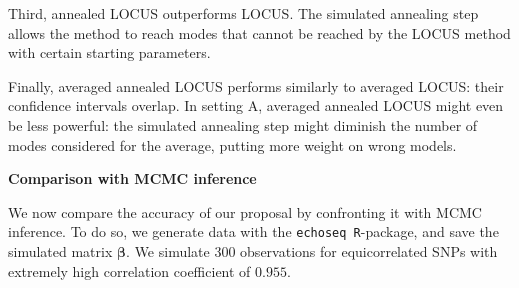 \documentclass[final]{beamer}
\begin{document}
\begin{multicols*}{3}
Third, annealed LOCUS outperforms LOCUS. The simulated annealing step allows the method to reach modes that cannot be reached by the LOCUS method with certain starting parameters. 

Finally, averaged annealed LOCUS performs similarly to averaged LOCUS: their confidence intervals overlap. In setting A, averaged annealed LOCUS might even be less powerful: the simulated annealing step might diminish the number of modes considered for the average, putting more weight on wrong models.

\vspace{1em}

\textbf{\large Comparison with MCMC inference}

\vspace{1em}
We now compare the accuracy of our proposal by confronting it with MCMC inference. To do so, we generate data with the \texttt{echoseq R}-package, and save the simulated matrix $\boldsymbol{\beta}$. We simulate $300$ observations for equicorrelated SNPs with extremely high correlation coefficient of $0.955$.


\end{multicols*}
\end{document}
